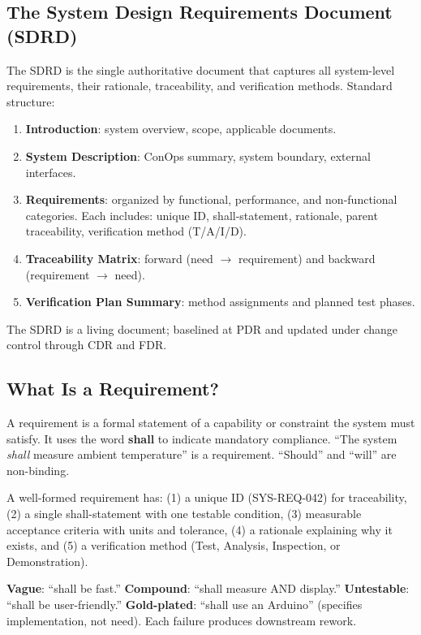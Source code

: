 \documentclass[11pt,letterpaper,twoside,openany]{book}
\begin{document}
\subsection{The System Design Requirements Document (SDRD)}
The SDRD is the single authoritative document that captures all system-level requirements, their rationale, traceability, and verification methods. Standard structure:
\begin{enumerate}[nosep,leftmargin=1.5em]
\item \textbf{Introduction}: system overview, scope, applicable documents.
\item \textbf{System Description}: ConOps summary, system boundary, external interfaces.
\item \textbf{Requirements}: organized by functional, performance, and non-functional categories. Each includes: unique ID, shall-statement, rationale, parent traceability, verification method (T/A/I/D).
\item \textbf{Traceability Matrix}: forward (need $\to$ requirement) and backward (requirement $\to$ need).
\item \textbf{Verification Plan Summary}: method assignments and planned test phases.
\end{enumerate}
The SDRD is a living document; baselined at PDR and updated under change control through CDR and FDR.


\subsection{What Is a Requirement?}
A requirement is a formal statement of a capability or constraint the system must satisfy. It uses the word \textbf{shall} to indicate mandatory compliance. ``The system \emph{shall} measure ambient temperature'' is a requirement. ``Should'' and ``will'' are non-binding.

A well-formed requirement has: (1) a unique ID (SYS-REQ-042) for traceability, (2) a single shall-statement with one testable condition, (3) measurable acceptance criteria with units and tolerance, (4) a rationale explaining why it exists, and (5) a verification method (Test, Analysis, Inspection, or Demonstration).

\begin{warningbox}
\textbf{Vague}: ``shall be fast.'' \textbf{Compound}: ``shall measure AND display.'' \textbf{Untestable}: ``shall be user-friendly.'' \textbf{Gold-plated}: ``shall use an Arduino'' (specifies implementation, not need). Each failure produces downstream rework.
\end{warningbox}
\end{document}
